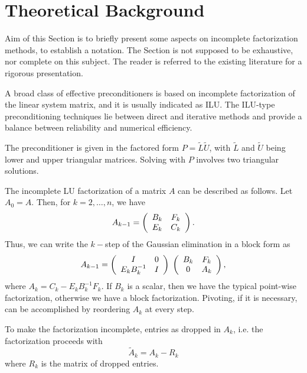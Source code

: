 
\section{Theoretical Background}
\label{sec:ifpack_theoretical}

Aim of this Section is to briefly present some aspects on incomplete
factorization methods, to establish a notation. The Section is not
supposed to be exhaustive, nor complete on this subject. The reader is
referred to the existing literature for a rigorous presentation.

\medskip

A broad class of effective preconditioners is based on incomplete
factorization of the linear system matrix, and it is usually indicated
as ILU.  The ILU-type preconditioning techniques lie between direct and
iterative methods and provide a balance between reliability and
numerical efficiency.

The preconditioner is given in the factored form
$P=\tilde{L} \tilde{U}$, with $\tilde{L}$ and $\tilde{U}$ being lower
and upper triangular matrices. Solving with $P$ involves two triangular
solutions.

The incomplete LU factorization of a matrix $A$ can be described as
follows. Let $A_0=A$. Then, for $k=2,\ldots,n$, we have
\[
A_{k-1} = 
\left(
\begin{array}{c c}
B_k & F_k \\
E_k & C_k \\
\end{array}
\right) .
\]
Thus, we can write the $k-$step of the Gaussian elimination in a block
form as
\[
A_{k-1} = 
\left(
\begin{array}{c c}
I & 0 \\
E_k B_k^{-1} & I \\
\end{array}
\right)
\;
\left(
\begin{array}{c c}
B_k & F_k \\
0 & A_k \\
\end{array}
\right) ,
\]
where $A_k = C_k - E_k B_k^{-1} F_k$. If $B_k$ is a scalar, then we have
the typical point-wise factorization, otherwise we have a block
factorization. Pivoting, if it is necessary, can be accomplished by
reordering $A_k$ at every step.

To make the factorization incomplete, entries as dropped in $A_k$, i.e.
the factorization proceeds with
\[
\tilde{A}_k = A_k - R_k
\]
where $R_k$ is the matrix of dropped entries. 

